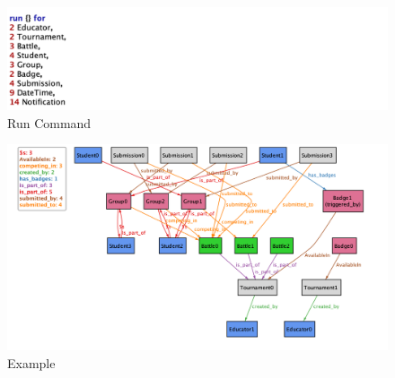 \begin{figure}[htbp!]
    \centering
    \includegraphics[width=\textwidth]{Graphics/Alloy/Run.png}
    \caption{Run Command}
    \label{fig:runcommand}
\end{figure}


\begin{figure}[htbp!]
    \centering
    \includegraphics[width=\textwidth]{Graphics/Alloy/Alloy.png}
    \caption{Example}
    \label{fig:example}
\end{figure}

\newpage